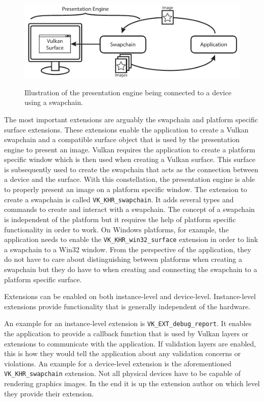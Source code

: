     \begin{figure}
      \caption{Illustration of the presentation engine being connected to a device using a swapchain.}
      \centering
      \includegraphics{Main/Images/PresentationEngine}
      \label{fig:PresentationEngine}
    \end{figure}

    The most important extensions are arguably the swapchain and platform specific surface extensions. These extensions enable the \gls{application} to create a Vulkan swapchain and a compatible surface object that is used by the presentation engine to present an image. Vulkan requires the \gls{application} to create a platform specific window which is then used when creating a Vulkan surface. This surface is subsequently used to create the swapchain that acts as the connection between a device and the surface. With this constellation, the presentation engine is able to properly present an image on a platform specific window. The extension to create a swapchain is called \lstinline{VK_KHR_swapchain}. It adds several types and commands to create and interact with a swapchain. The concept of a swapchain is independent of the platform but it requires the help of platform specific functionality in order to work. On Windows platforms, for example, the \gls{application} needs to enable the \lstinline{VK_KHR_win32_surface} extension in order to link a swapchain to a Win32 window. From the perspective of the \gls{application}, they do not have to care about distinguishing between platforms when creating a swapchain but they do have to when creating and connecting the swapchain to a platform specific surface.

    Extensions can be enabled on both instance-level and device-level. Instance-level extensions provide functionality that is generally independent of the hardware.

    An example for an instance-level extension is \lstinline{VK_EXT_debug_report}. It enables the \gls{application} to provide a callback function that is used by Vulkan layers or extensions to communicate with the \gls{application}. If validation layers are enabled, this is how they would tell the \gls{application} about any validation concerns or violations. An example for a device-level extension is the aforementioned \lstinline{VK_KHR_swapchain} extension. Not all physical \glspl{device} have to be capable of rendering graphics images. In the end it is up the extension author on which level they provide their extension.

